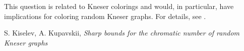 
This question is related to Kneser colorings and would, in particular, have implications for coloring random Kneser graphs. For details, see \cite{KK}.


\begin{thebibliography}{}
	 S. Kiselev, A. Kupavskii, {\it Sharp bounds for the chromatic number of random Kneser graphs}
\end{thebibliography}

